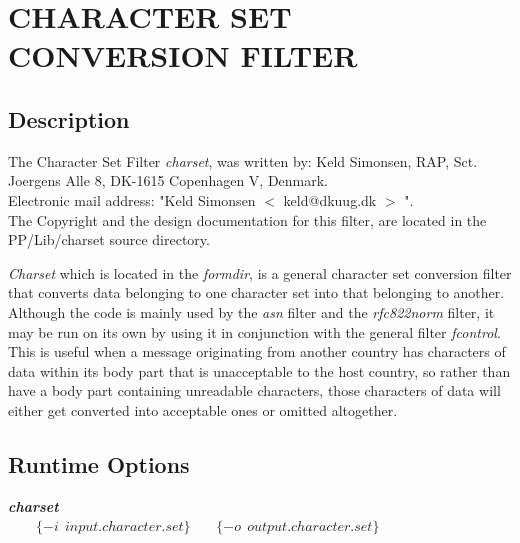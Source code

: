 
\section {CHARACTER SET CONVERSION FILTER}

\bigskip
\subsection {Description}
\medskip
\noindent The Character Set Filter {\em charset}, was written by: 
Keld Simonsen, RAP, Sct. Joergens Alle 8, DK-1615 Copenhagen V, Denmark.
\\
Electronic mail address: "Keld Simonsen
\begin{math} <\end{math} keld@dkuug.dk \begin{math} >\end{math} ".
\\
The Copyright and the design documentation for this filter, 
are located in the PP/Lib/charset source directory. 

\medskip
\noindent  
{\em Charset} which is located in the {\em formdir}, 
is a general character set conversion filter 
that converts data belonging to one character set into that belonging 
to another. 
Although the code is mainly used by the {\em asn} filter and the 
{\em rfc822norm} filter, it may be run on its own by using it in 
conjunction with the general filter {\em fcontrol}. 
This is useful when a message originating from another 
country has characters of data within its body part that is unacceptable 
to the host country, so rather than have a body part containing 
unreadable characters, those characters of data
will either get converted into acceptable ones or omitted altogether.


\bigskip\bigskip
\subsection {Runtime Options}
\medskip

\begin {tabbing}
{\bf {\em charset}} \\
\ \ \ \ \=
\begin{math} \{-i \ \ input.character.set\} \end{math} \ \ \ 
\= \begin{math} \{-o \ \ output.character.set\} \end{math} \ \ \ 
\= \begin{math} [ -x \  | \  -m ] \end{math}
\end{tabbing}


